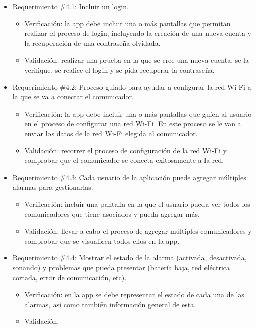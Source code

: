 \documentclass[
11pt, %
codirector, %
]{charter}
\begin{document}
\begin{itemize}
	\item Requerimiento \#4.1: Incluir un login.
	\begin{itemize}
		\item Verificación: la app debe incluir una o más pantallas que permitan realizar el proceso de login, incluyendo la creación de una nueva cuenta y la recuperación de una contraseña olvidada.
		\item Validación: realizar una prueba en la que se cree una nueva cuenta, se la verifique, se realice el login y se pida recuperar la contraseña.
	\end{itemize}
			
	\item Requerimiento \#4.2: Proceso guiado para ayudar a configurar la red Wi-Fi a la que se va a conectar el comunicador.
	\begin{itemize}
		\item Verificación: la app debe incluir una o más pantallas que guíen al usuario en el proceso de configurar una red Wi-Fi. En este proceso se le van a enviar los datos de la red Wi-Fi elegida al comunicador.
		\item Validación: recorrer el proceso de configuración de la red Wi-Fi y comprobar que el comunicador se conecta exitosamente a la red.
	\end{itemize}
			
	\item Requerimiento \#4.3: Cada usuario de la aplicación puede agregar múltiples alarmas para gestionarlas.
	\begin{itemize}
		\item Verificación: incluir una pantalla en la que el usuario pueda ver todos los comunicadores que tiene asociados y pueda agregar más.
		\item Validación: llevar a cabo el proceso de agregar múltiples comunicadores y comprobar que se visualicen todos ellos en la app.
	\end{itemize}
			
	\item Requerimiento \#4.4: Mostrar el estado de la alarma (activada, desactivada, sonando) y problemas que pueda presentar (batería baja, red eléctrica cortada, error de comunicación, etc).
	\begin{itemize}
		\item Verificación: en la app se debe representar el estado de cada una de las alarmas, así como también información general de esta.
		\item Validación:
	\end{itemize}
			

\end{itemize}
\end{document}

